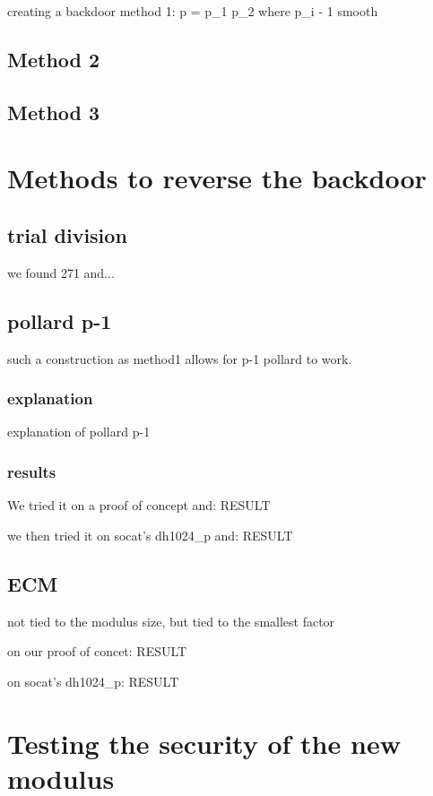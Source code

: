 \documentclass[a4paper,11pt]{article}
\begin{document}
creating a backdoor method 1: p = p_1 p_2 where p_i - 1 smooth

\subsection{Method 2}

\subsection{Method 3}

\section{Methods to reverse the backdoor}

\subsection{trial division}

we found 271 and...

\subsection{pollard p-1}

such a construction as method1 allows for p-1 pollard to work.

\subsubsection{explanation}

explanation of pollard p-1

\subsubsection{results}

We tried it on a proof of concept and: RESULT

we then tried it on socat's dh1024_p and: RESULT

\subsection{ECM}

not tied to the modulus size, but tied to the smallest factor

on our proof of concet: RESULT

on socat's dh1024_p: RESULT

\section{Testing the security of the new modulus}
\end{document}
